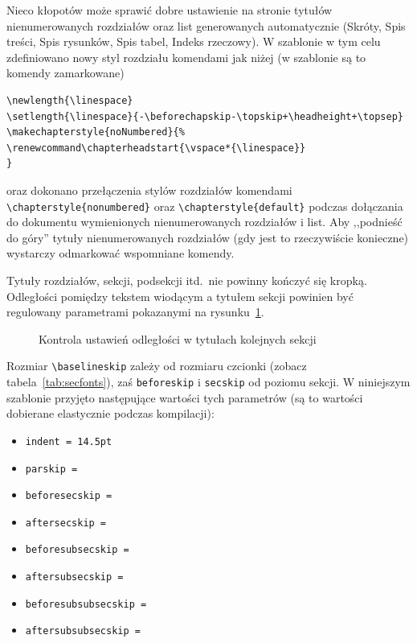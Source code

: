 Nieco kłopotów może sprawić dobre ustawienie na stronie tytułów nienumerowanych rozdziałów oraz list generowanych automatycznie (Skróty, Spis treści, Spis rysunków, Spis tabel, Indeks rzeczowy). W szablonie w tym celu zdefiniowano nowy styl rozdziału komendami jak niżej (w szablonie są to komendy zamarkowane)
\begin{lstlisting}[basicstyle=\footnotesize\ttfamily]
\newlength{\linespace}
\setlength{\linespace}{-\beforechapskip-\topskip+\headheight+\topsep}
\makechapterstyle{noNumbered}{%
\renewcommand\chapterheadstart{\vspace*{\linespace}}
}
\end{lstlisting}
oraz dokonano przełączenia stylów rozdziałów komendami \verb?\chapterstyle{nonumbered}? oraz \verb?\chapterstyle{default}? podczas dołączania do dokumentu wymienionych nienumerowanych rozdziałów i list. Aby ,,podnieść do góry'' tytuły nienumerowanych rozdziałów (gdy jest to rzeczywiście konieczne) wystarczy odmarkować wspomniane komendy.

Tytuły rozdziałów, sekcji, podsekcji itd.\ nie powinny kończyć się kropką. Odległości pomiędzy tekstem wiodącym a tytułem sekcji powinien być regulowany parametrami pokazanymi na rysunku~\ref{fig:LaySec}.
\begin{figure}[t]
	\runinheadfalse
	\drawparameterstrue
	\drawheading{\Large\bfseries}
	\caption{Kontrola ustawień odległości w tytułach kolejnych sekcji}
	\label{fig:LaySec}
\end{figure}
Rozmiar \verb?\baselineskip? zależy od rozmiaru czcionki (zobacz tabela~\ref{tab:secfonts}), zaś \texttt{beforeskip} i \texttt{secskip} od poziomu sekcji. W niniejszym szablonie przyjęto następujące wartości tych parametrów (są to wartości dobierane elastycznie podczas kompilacji):
\begin{itemize}
	\item \texttt{indent = 14.5pt}
	\item \texttt{parskip = \printlength{\parskip}}
	\item \texttt{beforesecskip = \printlength{\beforesecskip}}
	\item \texttt{aftersecskip = \printlength{\aftersecskip}}
	\item \texttt{beforesubsecskip = \printlength{\beforesubsecskip}}
	\item \texttt{aftersubsecskip = \printlength{\aftersubsecskip}}
	\item \texttt{beforesubsubsecskip = \printlength{\beforesubsecskip}}
	\item \texttt{aftersubsubsecskip = \printlength{\aftersubsecskip}}
\end{itemize}

